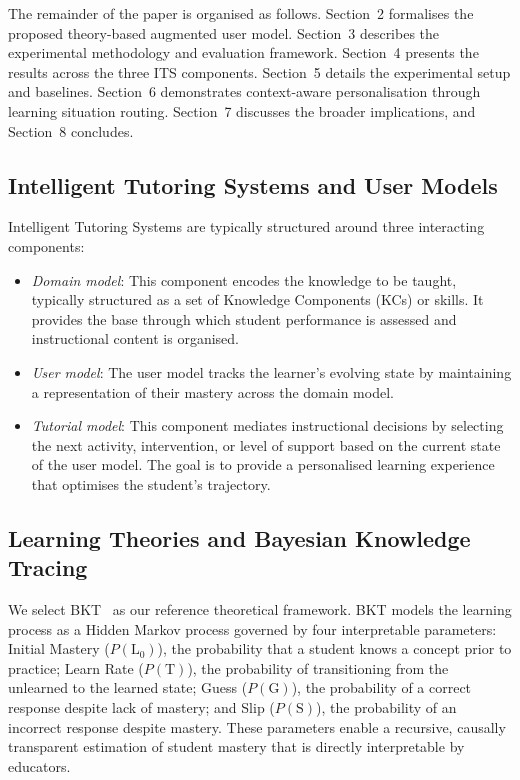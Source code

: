 \documentclass[runningheads]{llncs}
\begin{document}
The remainder of the paper is organised as follows. Section~2 formalises the proposed theory-based augmented user model. Section~3 describes the experimental methodology and evaluation framework. Section~4 presents the results across the three ITS components. Section~5 details the experimental setup and baselines. Section~6 demonstrates context-aware personalisation through learning situation routing. Section~7 discusses the broader implications, and Section~8 concludes.

\subsection{Intelligent Tutoring Systems and User Models}

Intelligent Tutoring Systems are typically structured around three interacting components: 

\begin{itemize}
    \item \textit{Domain model}: This component encodes the knowledge to be taught, typically structured as a set of Knowledge Components (KCs) or skills. It provides the base through which student performance is assessed and instructional content is organised.
    \item \textit{User model}: The user model tracks the learner's evolving state by maintaining a representation of their mastery across the domain model. 
    \item \textit{Tutorial model}: This component mediates instructional decisions by selecting the next activity, intervention, or level of support based on the current state of the user model. The goal is to provide a personalised learning experience that optimises the student's trajectory.
\end{itemize}

\subsection{Learning Theories and Bayesian Knowledge Tracing}

We select BKT~\cite{corbett1994knowledge} as our reference theoretical framework. BKT models the learning process as a Hidden Markov process governed by four interpretable parameters: Initial Mastery ($P(\text{L}_0)$), the probability that a student knows a concept prior to practice; Learn Rate ($P(\text{T})$), the probability of transitioning from the unlearned to the learned state; Guess ($P(\text{G})$), the probability of a correct response despite lack of mastery; and Slip ($P(\text{S})$), the probability of an incorrect response despite mastery. These parameters enable a recursive, causally transparent estimation of student mastery that is directly interpretable by educators.
\end{document}
